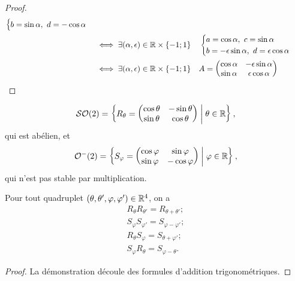 \begin{proof}
\begin{align}
\begin{cases}
        b=\sin\alpha, \ d=-\cos\alpha \end{cases} \\
        &\iff \exists (\alpha, \epsilon) \in \mathbb{R} \times \{-1; 1\} \quad 
        \begin{cases} a=\cos\alpha, \ c=\sin\alpha \\ 
        b=-\epsilon\sin\alpha, \ d=\epsilon\cos\alpha \end{cases}\\
        &\iff \exists (\alpha, \epsilon) \in \mathbb{R} \times \{-1; 1\} \quad 
        A=\begin{pmatrix} \cos \alpha & -\epsilon\sin\alpha \\ \sin\alpha 
        & \epsilon\cos\alpha\end{pmatrix}
    \end{align}
\end{proof}
\begin{theo}
  \begin{equation}
    \mathcal{SO}\!\left(2\right) = \left\{R_\theta=\begin{pmatrix}\cos\theta & -\sin\theta \\ 
    \sin\theta & \cos\theta\end{pmatrix}\mathrel{}\middle|\mathrel{}\theta \in \mathbb{R}\right\},
  \end{equation}
  qui est abélien, et
  \begin{equation}
    \mathcal{O}^{-}\!\left(2\right) = \left\{S_\varphi=\begin{pmatrix}\cos\varphi & \sin\varphi 
    \\ \sin\varphi & -\cos\varphi \end{pmatrix}\mathrel{}\middle|\mathrel{}\varphi \in \mathbb{R}\right\},
  \end{equation}
  qui n'est pas stable par multiplication.
\end{theo}
\begin{theo}
  Pour tout quadruplet \((\theta, \theta', \varphi, \varphi') \in \mathbb{R}^4\), on 
  a
  \begin{gather}
    R_\theta R_{\theta'} = R_{\theta+\theta'}; \\
    S_\varphi S_{\varphi'} = S_{\varphi-\varphi'}; \\
    R_\theta S_\varphi = S_{\theta+\varphi'}; \\
    S_\varphi R_\theta = S_{\varphi-\theta}.
  \end{gather}
\end{theo}
\begin{proof}
  La démonstration découle des formules d'addition trigonométriques.
\end{proof}
